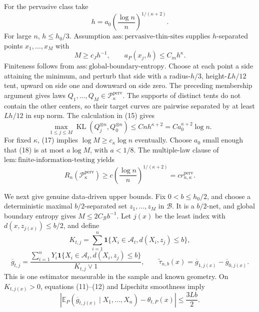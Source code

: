 For the pervasive class take
\[
 h=a_0\left(\frac{\log n}{n}\right)^{1/(\kappa+2)}.
\]
For large \(n\), \(h\le h_0/3\).  Assumption \(\mathrm{ass:pervasive\text{-}thin\text{-}sites}\) supplies \(h\)-separated points \(x_1,\ldots,x_M\) with
\[
 M\ge c_Jh^{-1},\qquad a_P(x_j,h)\le C_mh^{\kappa}. \tag{17}
\]
Finiteness follows from \(\mathrm{ass:global\text{-}boundary\text{-}entropy}\).  Choose at each point a side attaining the minimum, and perturb that side with a radius-\(h/3\), height-\(Lh/12\) tent, upward on side one and downward on side zero.  The preceding membership argument gives laws \(Q_1,\ldots,Q_M\in\mathcal P_{\kappa}^{\mathrm{perv}}\).  The supports of distinct tents do not contain the other centers, so their target curves are pairwise separated by at least \(Lh/12\) in sup norm.  The calculation in (15) gives
\[
 \max_{1\le j\le M}\operatorname{KL}(Q_j^{\otimes n},Q_0^{\otimes n})
 \le Cnh^{\kappa+2}=Ca_0^{\kappa+2}\log n. \tag{18}
\]
For fixed \(\kappa\), (17) implies \(\log M\ge c_{\kappa}\log n\) eventually.  Choose \(a_0\) small enough that (18) is at most \(a\log M\), with \(a<1/8\).  The multiple-law clause of \(\mathrm{lem:finite\text{-}information\text{-}testing}\) yields
\[
 R_n(\mathcal P_{\kappa}^{\mathrm{perv}})
 \ge c\left(\frac{\log n}{n}\right)^{1/(\kappa+2)}
 =c r_{n,\kappa}^{\mathrm{perv}}. \tag{19}
\]

We next give genuine data-driven upper bounds.  Fix \(0<b\le h_0/2\), and choose a deterministic maximal \(b/2\)-separated set \(z_1,\ldots,z_M\) in \(\mathcal B\).  It is a \(b/2\)-net, and global boundary entropy gives \(M\le2C_{\mathcal B}b^{-1}\).  Let \(j(x)\) be the least index with \(d(x,z_{j(x)})\le b/2\), and define
\[
 K_{t,j}=\sum_{i=1}^n\mathbf1\{X_i\in\mathcal A_t,d(X_i,z_j)\le b\},
\]
\[
 \overline g_{t,j}=\frac{\sum_{i=1}^nY_i\mathbf1\{X_i\in\mathcal A_t,d(X_i,z_j)\le b\}}{K_{t,j}\vee1},
 \qquad
 \widetilde\tau_{n,b}(x)=\overline g_{1,j(x)}-\overline g_{0,j(x)}.
\]
This is one estimator measurable in the sample and known geometry.  On \(K_{t,j(x)}>0\), equations (11)--(12) and Lipschitz smoothness imply
\[
 \left|\mathbb E_P(\overline g_{t,j(x)}\mid X_1,\ldots,X_n)-\theta_{t,P}(x)\right|
 \le\frac{3Lb}{2}. \tag{20}
\]

